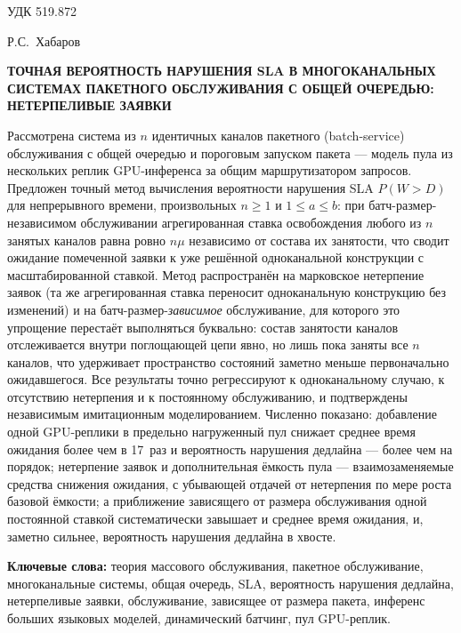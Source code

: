 \documentclass[12pt,a4paper]{article}
\newcommand{\keywordslabel}{\textbf{Ключевые слова: }}
\begin{document}
\sloppy

\noindent УДК 519.872

\bigskip
\noindent Р.С.~Хабаров


\bigskip
\begin{center}
\begin{minipage}{0.9\linewidth}
\centering
{\large\bfseries ТОЧНАЯ ВЕРОЯТНОСТЬ НАРУШЕНИЯ SLA В МНОГОКАНАЛЬНЫХ СИСТЕМАХ ПАКЕТНОГО ОБСЛУЖИВАНИЯ С ОБЩЕЙ ОЧЕРЕДЬЮ: НЕТЕРПЕЛИВЫЕ ЗАЯВКИ}
\end{minipage}
\end{center}

\bigskip
\noindent\small
Рассмотрена система из $n$ идентичных каналов пакетного (batch-service) обслуживания с общей очередью и пороговым запуском пакета --- модель пула из нескольких реплик GPU-инференса за общим маршрутизатором запросов. Предложен точный метод вычисления вероятности нарушения SLA $P(W>D)$ для непрерывного времени, произвольных $n\ge1$ и $1\le a\le b$: при батч-размер-независимом обслуживании агрегированная ставка освобождения любого из $n$ занятых каналов равна ровно $n\mu$ независимо от состава их занятости, что сводит ожидание помеченной заявки к уже решённой одноканальной конструкции с масштабированной ставкой. Метод распространён на марковское нетерпение заявок (та же агрегированная ставка переносит одноканальную конструкцию без изменений) и на батч-размер-\textit{зависимое} обслуживание, для которого это упрощение перестаёт выполняться буквально: состав занятости каналов отслеживается внутри поглощающей цепи явно, но лишь пока заняты все $n$ каналов, что удерживает пространство состояний заметно меньше первоначально ожидавшегося. Все результаты точно регрессируют к одноканальному случаю, к отсутствию нетерпения и к постоянному обслуживанию, и подтверждены независимым имитационным моделированием. Численно показано: добавление одной GPU-реплики в предельно нагруженный пул снижает среднее время ожидания более чем в 17~раз и вероятность нарушения дедлайна --- более чем на порядок; нетерпение заявок и дополнительная ёмкость пула --- взаимозаменяемые средства снижения ожидания, с убывающей отдачей от нетерпения по мере роста базовой ёмкости; а приближение зависящего от размера обслуживания одной постоянной ставкой систематически завышает и среднее время ожидания, и, заметно сильнее, вероятность нарушения дедлайна в хвосте.

\medskip
\noindent\keywordslabel теория массового обслуживания, пакетное обслуживание, многоканальные системы, общая очередь, SLA, вероятность нарушения дедлайна, нетерпеливые заявки, обслуживание, зависящее от размера пакета, инференс больших языковых моделей, динамический батчинг, пул GPU-реплик.
\normalsize
\end{document}
